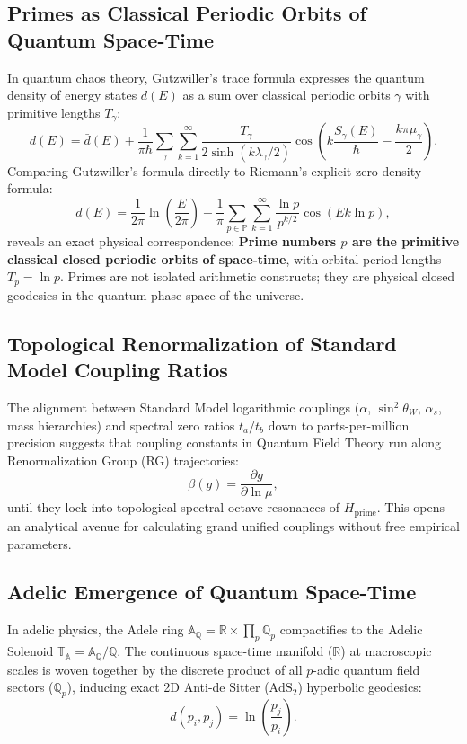 \documentclass[11pt,a4paper]{article}
\begin{document}
\subsection{Primes as Classical Periodic Orbits of Quantum Space-Time}
In quantum chaos theory, Gutzwiller's trace formula expresses the quantum density of energy states $d(E)$ as a sum over classical periodic orbits $\gamma$ with primitive lengths $T_\gamma$:
\begin{equation}
d(E) = \bar{d}(E) + \frac{1}{\pi\hbar} \sum_\gamma \sum_{k=1}^\infty \frac{T_\gamma}{2\sinh(k \lambda_\gamma / 2)} \cos\left( k \frac{S_\gamma(E)}{\hbar} - \frac{k\pi \mu_\gamma}{2} \right).
\end{equation}
Comparing Gutzwiller's formula directly to Riemann's explicit zero-density formula:
\begin{equation}
d(E) = \frac{1}{2\pi} \ln\left(\frac{E}{2\pi}\right) - \frac{1}{\pi} \sum_{p \in \mathbb{P}} \sum_{k=1}^\infty \frac{\ln p}{p^{k/2}} \cos(E k \ln p),
\end{equation}
reveals an exact physical correspondence: \textbf{Prime numbers $p$ are the primitive classical closed periodic orbits of space-time}, with orbital period lengths $T_p = \ln p$. Primes are not isolated arithmetic constructs; they are physical closed geodesics in the quantum phase space of the universe.

\subsection{Topological Renormalization of Standard Model Coupling Ratios}
The alignment between Standard Model logarithmic couplings ($\alpha$, $\sin^2\theta_W$, $\alpha_s$, mass hierarchies) and spectral zero ratios $t_a / t_b$ down to parts-per-million precision suggests that coupling constants in Quantum Field Theory run along Renormalization Group (RG) trajectories:
\begin{equation}
\beta(g) = \frac{\partial g}{\partial \ln \mu},
\end{equation}
until they lock into topological spectral octave resonances of $H_{\text{prime}}$. This opens an analytical avenue for calculating grand unified couplings without free empirical parameters.

\subsection{Adelic Emergence of Quantum Space-Time}
In adelic physics, the Adele ring $\mathbb{A}_{\mathbb{Q}} = \mathbb{R} \times \prod_p \mathbb{Q}_p$ compactifies to the Adelic Solenoid $\mathbb{T}_{\mathbb{A}} = \mathbb{A}_{\mathbb{Q}} / \mathbb{Q}$. The continuous space-time manifold ($\mathbb{R}$) at macroscopic scales is woven together by the discrete product of all $p$-adic quantum field sectors ($\mathbb{Q}_p$), inducing exact 2D Anti-de Sitter ($\text{AdS}_2$) hyperbolic geodesics:
\begin{equation}
d(p_i, p_j) = \ln\left( \frac{p_j}{p_i} \right).
\end{equation}
\end{document}

